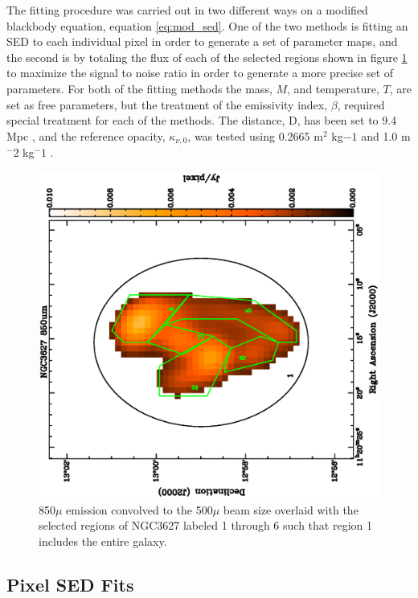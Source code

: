 The fitting procedure was carried out in two different ways on a modified blackbody equation, equation \ref{eq:mod_sed}.  One of the two methods is fitting an SED to each individual pixel in order to generate a set of parameter maps, and the second is by totaling the flux of each of the selected regions shown in figure \ref{fig:regions} to maximize the signal to noise ratio in order to generate a more precise set of parameters.  For both of the fitting methods the mass, $M$, and temperature, $T$, are set as free parameters, but the treatment of the emissivity index, $\beta$, required special treatment for each of the methods.  The distance, D, has been set to 9.4 Mpc \citep{walter2008}, and the reference opacity, $\kappa_{\nu,0}$, was tested using 0.2665 m$^2$ kg$-1$ \citep{li2001} and 1.0 m$^-2$ kg$^-1$ \citep{planckxxv2011}.

\begin{figure}
  \centering
  \includegraphics[width=1.\textwidth,angle=270]{sed_imgs/regions.eps}
  \caption[NGC3627 Regions]{850$\mu$ emission convolved to the 500$\mu$ beam size overlaid with the selected regions of NGC3627 labeled 1 through 6 such that region 1 includes the entire galaxy.}
  \label{fig:regions}
\end{figure}

\subsection{Pixel SED Fits}


